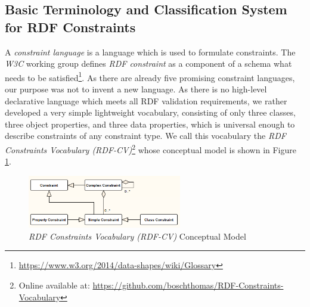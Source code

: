 \documentclass[a4paper,fontsize=11pt]{scrartcl}
\begin{document}
\subsection{Basic Terminology and Classification System for RDF Constraints}

A \emph{constraint language} is a language which is used to formulate constraints.
The \emph{W3C} working group defines \emph{RDF constraint} as a component of a schema what needs to be satisfied\footnote{\url{https://www.w3.org/2014/data-shapes/wiki/Glossary}}.
As there are already five promising constraint languages, 
our purpose was not to invent a new language.
As there is no high-level declarative language which meets all RDF validation requirements,
we rather developed a very simple lightweight vocabulary,
consisting of only three classes, three object properties, and three data properties, 
which is universal enough to describe constraints of any constraint type.
We call this vocabulary the \emph{RDF Constraints Vocabulary (RDF-CV)}\footnote{Online available at: \url{https://github.com/boschthomas/RDF-Constraints-Vocabulary}} whose conceptual model is shown in Figure \ref{fig:RDF-CV-conceptual-model}.
\begin{figure}[H]
	\centering
		\includegraphics[width=0.60\textwidth]{images/RDF-CV-conceptual-model.png}
	\caption{\emph{RDF Constraints Vocabulary (RDF-CV)} Conceptual Model}
	\label{fig:RDF-CV-conceptual-model}
\end{figure}
\end{document}
